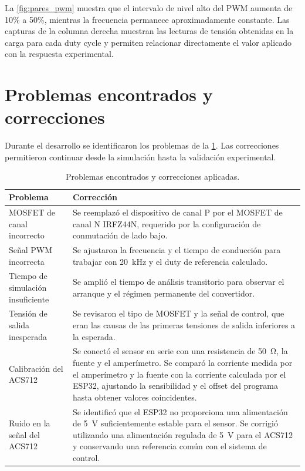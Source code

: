 \documentclass[12pt]{article}
\begin{document}
La \cref{fig:pares_pwm} muestra que el intervalo de nivel alto del PWM aumenta de 10\% a 50\%, mientras la frecuencia permanece aproximadamente constante. Las capturas de la columna derecha muestran las lecturas de tensión obtenidas en la carga para cada duty cycle y permiten relacionar directamente el valor aplicado con la respuesta experimental.

\section{Problemas encontrados y correcciones}
Durante el desarrollo se identificaron los problemas de la \cref{tab:problemas}. Las correcciones permitieron continuar desde la simulación hasta la validación experimental.

\begin{table}[H]
\centering
\caption{Problemas encontrados y correcciones aplicadas.}
\label{tab:problemas}
\begin{tabular}{p{4.5cm}p{8cm}}
\toprule
\textbf{Problema} & \textbf{Corrección}\\
\midrule
MOSFET de canal incorrecto & Se reemplazó el dispositivo de canal P por el MOSFET de canal N IRFZ44N, requerido por la configuración de conmutación de lado bajo.\\
Señal PWM incorrecta & Se ajustaron la frecuencia y el tiempo de conducción para trabajar con \SI{20}{kHz} y el duty de referencia calculado.\\
Tiempo de simulación insuficiente & Se amplió el tiempo de análisis transitorio para observar el arranque y el régimen permanente del convertidor.\\
Tensión de salida inesperada & Se revisaron el tipo de MOSFET y la señal de control, que eran las causas de las primeras tensiones de salida inferiores a la esperada.\\
Calibración del ACS712 & Se conectó el sensor en serie con una resistencia de \SI{50}{\ohm}, la fuente y el amperímetro. Se comparó la corriente medida por el amperímetro y la fuente con la corriente calculada por el ESP32, ajustando la sensibilidad y el offset del programa hasta obtener valores coincidentes.\\
Ruido en la señal del ACS712 & Se identificó que el ESP32 no proporciona una alimentación de \SI{5}{V} suficientemente estable para el sensor. Se corrigió utilizando una alimentación regulada de \SI{5}{V} para el ACS712 y conservando una referencia común con el sistema de control.\\
\bottomrule
\end{tabular}
\end{table}
\end{document}
